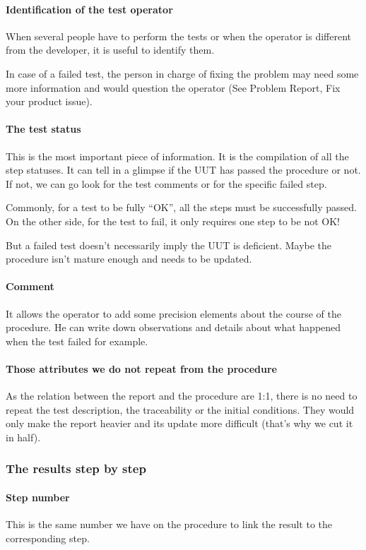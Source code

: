 \paragraph{Identification of the test operator}
When several people have to perform the tests or when the operator is different from the developer, it is useful to identify them.

In case of a failed test, the person in charge of fixing the problem may need some more information and would question the operator (See Problem Report, Fix your product issue).

\paragraph{The test status}
This is the most important piece of information. It is the compilation of all the step statuses. It can tell in a glimpse if the UUT has passed the procedure or not. If not, we can go look for the test comments or for the specific failed step.

Commonly, for a test to be fully “OK”, all the steps must be successfully passed.
On the other side, for the test to fail, it only requires one step to be not OK!

But a failed test doesn’t necessarily imply the UUT is deficient. Maybe the procedure isn’t mature enough and needs to be updated.

\paragraph{Comment}
It allows the operator to add some precision elements about the course of the procedure. He can write down observations and details about what happened when the test failed for example.

\paragraph{Those attributes we do not repeat from the procedure}
As the relation between the report and the procedure are 1:1, there is no need to repeat the test description, the traceability or the initial conditions. They would only make the report heavier and its update more difficult (that’s why we cut it in half).

\subsubsection{The results step by step}
\paragraph{Step number}
This is the same number we have on the procedure to link the result to the corresponding step.


